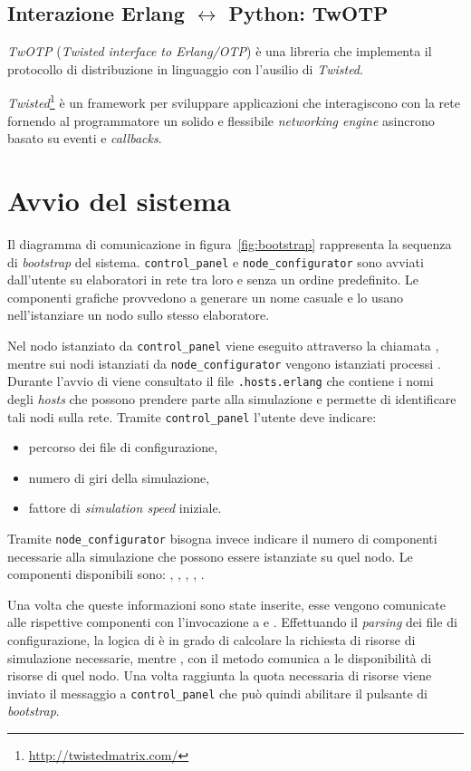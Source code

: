 \subsection*{Interazione Erlang $\leftrightarrow$ Python: TwOTP}
\textsl{TwOTP} (\textit{Twisted interface to Erlang/OTP}) è una libreria che implementa il protocollo di distribuzione \Erlang{} in linguaggio \Python{} con l'ausilio di \textsl{Twisted}.

\textsl{Twisted}\footnote{\url{http://twistedmatrix.com/}} è un framework per sviluppare applicazioni che interagiscono con la rete fornendo al programmatore un solido e flessibile \textit{networking engine} asincrono basato su eventi e \textit{callbacks}.

\section{Avvio del sistema}
\label{sec:avvio}
Il diagramma di comunicazione in figura~\ref{fig:bootstrap} rappresenta la sequenza di \textit{bootstrap} del sistema. \texttt{control\_panel} e \texttt{node\_configurator} sono avviati dall'utente su elaboratori in rete tra loro e senza un ordine predefinito. Le componenti grafiche provvedono a generare un nome casuale e lo usano nell'istanziare un nodo \Erlang{} sullo stesso elaboratore.

Nel nodo \Erlang{} istanziato da \texttt{control\_panel} viene eseguito \bootserv{} attraverso la chiamata , mentre sui nodi istanziati da \texttt{node\_configurator} vengono istanziati processi \nodeman{}. Durante l'avvio di \nodeman{} viene consultato il file \texttt{.hosts.erlang} che contiene i nomi degli \textit{hosts} che possono prendere parte alla simulazione e permette di identificare tali nodi sulla rete.
Tramite \texttt{control\_panel} l'utente deve indicare:
\begin{itemize}
\item percorso dei file di configurazione,
\item numero di giri della simulazione,
\item fattore di \textit{simulation speed} iniziale.
\end{itemize}
Tramite \texttt{node\_configurator} bisogna invece indicare il numero di componenti necessarie alla simulazione che possono essere istanziate su quel nodo. Le componenti disponibili sono: \sched{}, \evdisp{}, \car{}, \team{}, \weather{}.

Una volta che queste informazioni sono state inserite, esse vengono comunicate alle rispettive componenti \Erlang{} con l'invocazione a  e . Effettuando il \textit{parsing} dei file di configurazione, la logica di  è in grado di calcolare la richiesta di risorse di simulazione necessarie, mentre , con il metodo  comunica a \bootserv{} le disponibilità di risorse di quel nodo. Una volta raggiunta la quota necessaria di risorse viene inviato il messaggio  a \texttt{control\_panel} che può quindi abilitare il pulsante di \textit{bootstrap}.

